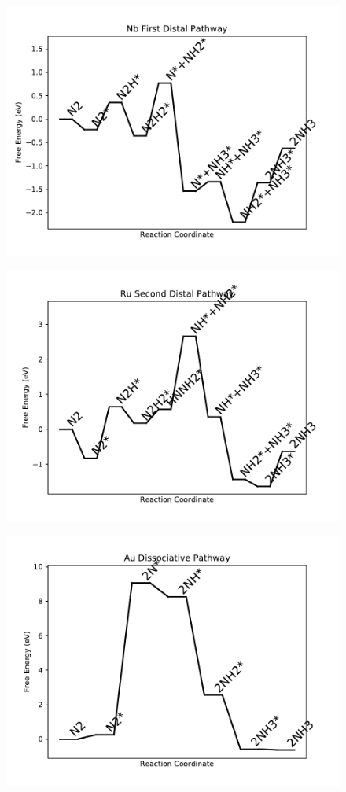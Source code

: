 \begin{figure}
\includegraphics[width=0.8\linewidth]{data/plots/Nb_distal_1.pdf}
\end{figure}

\begin{figure}
\includegraphics[width=0.8\linewidth]{data/plots/Ru_distal_2.pdf}
\end{figure}

\begin{figure}
\includegraphics[width=0.8\linewidth]{data/plots/Au_dissociative.pdf}
\end{figure}

